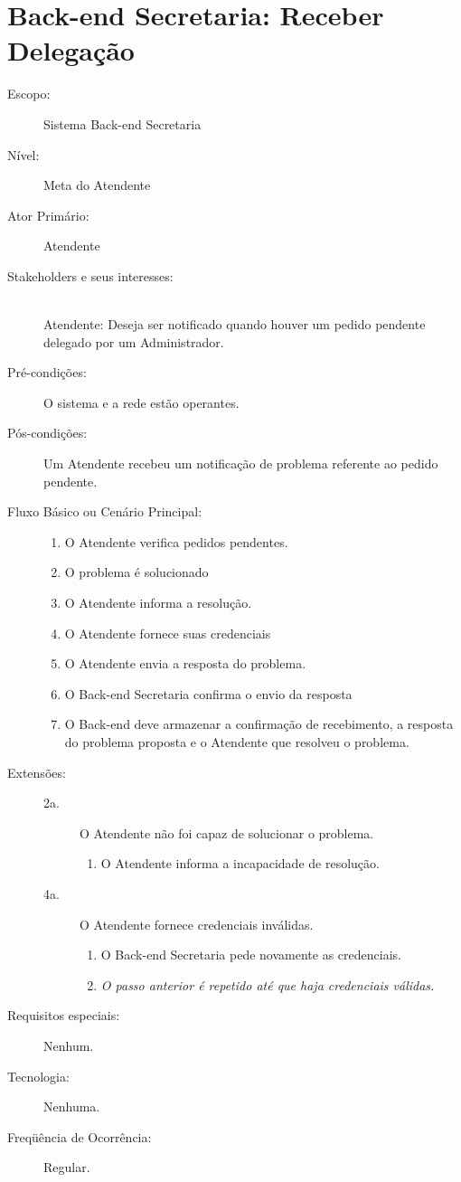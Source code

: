 \documentclass[brazil,times]{abnt}
\begin{document}
\section{Back-end Secretaria: Receber Delegação \label{caso-receber-delegacao}}
\begin{description}
\item[Escopo:] Sistema Back-end Secretaria
\item[Nível:] Meta do Atendente
\item[Ator Primário:] Atendente
\item[Stakeholders e seus interesses:] \hfill \\
Atendente: Deseja ser notificado quando houver um pedido pendente delegado por
um Administrador.

\item[Pré-condições:] O sistema e a rede estão operantes.
\item[Pós-condições:] Um Atendente recebeu um notificação de problema referente
ao pedido pendente.
\item[Fluxo Básico ou Cenário Principal:]\hfill
\begin{enumerate}
  \item O Atendente verifica pedidos pendentes.
  \item O problema é solucionado
  \item O Atendente informa a resolução.
  \item O Atendente fornece suas credenciais 
  \item O Atendente envia a resposta do problema.
  \item O Back-end Secretaria confirma o envio da resposta
  \item O Back-end deve armazenar a confirmação de recebimento, a resposta
  do problema proposta e o Atendente que resolveu o problema.
\end{enumerate}

\item[Extensões:]\hfill
\begin{description}
	\item[2a.] O Atendente não foi capaz de solucionar o problema.
	\begin{enumerate}
 		\item O Atendente informa a incapacidade de resolução.
	\end{enumerate} 
	
	\item[4a.] O Atendente fornece credenciais inválidas. 
	\begin{enumerate}
 		\item O Back-end Secretaria pede novamente as credenciais.
 		\item \emph{O passo anterior é repetido até que haja credenciais válidas.}
	\end{enumerate} 
\end{description}
\item[Requisitos especiais:] Nenhum.
\item[Tecnologia:] Nenhuma.
\item[Freqüência de Ocorrência:] Regular.

\end{description}
\end{document}
